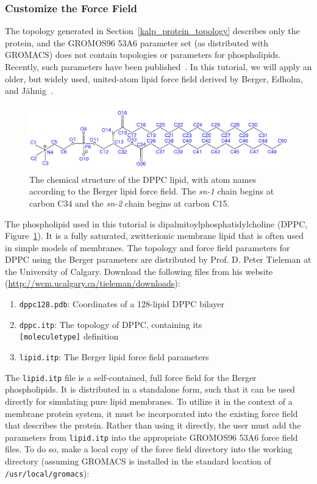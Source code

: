 \documentclass[9pt,tutorial,pubversion]{livecoms}
\begin{document}
\subsubsection{Customize the Force Field} \label{kalp_ff}

The topology generated in Section~\ref{kalp_protein_topology} describes only the protein, and the GROMOS96 53A6 parameter set (as distributed with GROMACS) does not contain topologies or parameters for phospholipids. Recently, such parameters have been published~\cite{Kukol2009}. In this tutorial, we will apply an older, but widely used, united-atom lipid force field derived by Berger, Edholm, and J{\"a}hnig~\cite{Berger1997}.

\begin{figure}[h!]
\centering
\includegraphics{DPPC_new_label}
\caption{The chemical structure of the DPPC lipid, with atom names according to the Berger lipid force field. The {\em sn-1} chain begins at carbon C34 and the {\em sn-2} chain begins at carbon C15.}
\label{kalp_dppc_structure_fig}
\end{figure}

The phospholipid used in this tutorial is dipalmitoylphosphatidylcholine (DPPC, Figure~\ref{kalp_dppc_structure_fig}). It is a fully saturated, zwitterionic membrane lipid that is often used in simple models of membranes. The topology and force field parameters for DPPC using the Berger parameters are distributed by Prof. D. Peter Tieleman at the University of Calgary. Download the following files from his website (\url{http://wcm.ucalgary.ca/tieleman/downloads}):

\begin{enumerate}
	\item{\texttt{dppc128.pdb}: Coordinates of a 128-lipid DPPC bilayer}
	\item{\texttt{dppc.itp}: The topology of DPPC, containing its\\ \texttt{[moleculetype]} definition}
	\item{\texttt{lipid.itp}: The Berger lipid force field parameters}
\end{enumerate}

The \texttt{lipid.itp} file is a self-contained, full force field for the Berger phospholipids. It is distributed in a standalone form, such that it can be used directly for simulating pure lipid membranes. To utilize it in the context of a membrane protein system, it must be incorporated into the existing force field that describes the protein. Rather than using it directly, the user must add the parameters from \texttt{lipid.itp} into the appropriate GROMOS96 53A6 force field files. To do so, make a local copy of the force field directory into the working directory (assuming GROMACS is installed in the standard location of \texttt{/usr/local/gromacs}):
\end{document}
